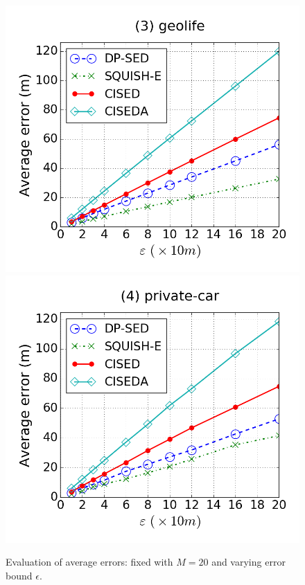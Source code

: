 \begin{figure}[tb]
\includegraphics[scale = 0.250]{figures/Exp-error-epsilon-geolife.png}
\includegraphics[scale = 0.250]{figures/Exp-error-epsilon-private.png}
\vspace{-2ex}
\caption{\small Evaluation of average errors: fixed with $M=20$ and varying error bound $\epsilon$.}
\label{fig:ae-m20}
\vspace{-2ex}
\end{figure}






